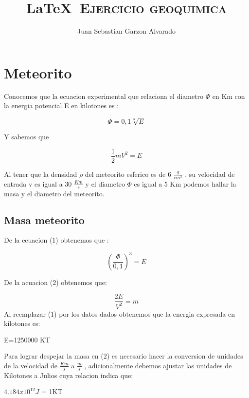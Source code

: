 \documentclass[12pt]{article}
\title{\LaTeX\ \textsc{Ejercicio geoquimica}}
\author{Juan Sebastian Garzon Alvarado}
\begin{document}
 
\maketitle
\date{}
\section{Meteorito}

Conocemos que la ecuacion experimental que relaciona el diametro $\Phi$ en Km con la energia potencial E en kilotones es :

\begin{equation}\label{eq:1}
\Phi =0,1 \sqrt[3]{E}
\end{equation}

Y sabemos que

\begin{equation}\label{eq:2}
\frac{1}{2} mV^2 = E
\end{equation}

Al tener que la densidad $\rho$ del meteorito esferico es de 6 $\frac{g}{cm^3}$ , su velocidad de entrada v es igual a 30 $\frac{Km}{s}$ y el diametro $\Phi$ es igual a 5 Km podemos hallar la masa y el diametro del meteorito.

\subsection{Masa meteorito}

De la ecuacion (1) obtenemos que :

\begin{equation}\label{eq:3}
(\dfrac{\Phi}{0,1})^3 = E
\end{equation}

De la acuacion (2) obtenemos que:

\begin{equation}\label{eq:4}
\dfrac{2E}{V^2} = m
\end{equation}
Al reemplazar (1) por los datos dados obtenemos que la energia expresada en kilotones es:
\begin{center}
 E=1250000 KT
\end{center}

Para lograr despejar la masa en (2) es necesario hacer la conversion de unidades de la velocidad de $\frac{Km}{s}$ a $\frac{m}{s}$ , adicionalmente debemos ajustar las unidades de Kilotones a Julios cuya relacion indica que:

\begin{center}
$4.184x10^{12} J$ = 1KT
\end{center}
\end{document}
